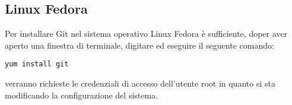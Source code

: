 \subsection{Linux Fedora}
Per installare Git nel sistema operativo Linux Fedora è sufficiente, doper aver aperto una finestra di terminale, digitare ed eseguire il seguente comando:

\begin{center}
\texttt{yum install git}
\end{center}

verranno richieste le credenziali di accesso dell'utente root in quanto si sta modificando la configurazione del sistema.